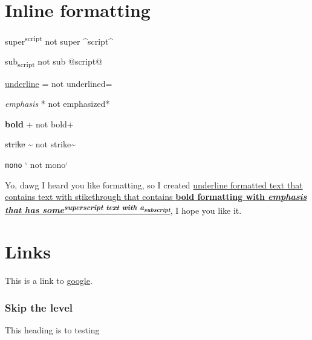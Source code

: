 \section{\label{inline-formatting}Inline formatting}
\par super\textsuperscript{script} not super {\textasciicircum}script{\textasciicircum}
\par sub\textsubscript{script} not sub @script@
\par \ul{underline}  = not underlined=
\par \emph{emphasis} * not emphasized*
\par \textbf{bold} + not bold+
\par \st{strike} {\textasciitilde} not strike{\textasciitilde}
\par \texttt{mono} ` not mono`
\par Yo, dawg I heard you like formatting, so I created \ul{underline formatted text that contains text with stikethrough that contains \textbf{bold formatting with \emph{emphasis that has some\textsuperscript{superscript text with a\textsubscript{subscript}}}}}, I hope you like it.
\section{\label{links}Links}
\par This is a link to \href{https://www.google.com}{google}.
\subsubsection{\label{skip-the-level}Skip the level}
\par This heading is to testing 
